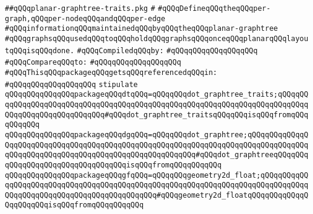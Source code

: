 \label{src/lib/std/dot/planar-graphtree-traits.pkg}
\verb|##qQQqplanar-graphtree-traits.pkg|\newline
\verb|#|\newline
\verb|#qQQqDefineqQQqtheqQQqper-graph,qQQqper-nodeqQQqandqQQqper-edge|\newline
\verb|#qQQqinformationqQQqmaintainedqQQqbyqQQqtheqQQqplanar-graphtree|\newline
\verb|#qQQqgraphsqQQqusedqQQqtoqQQqholdqQQqgraphsqQQqonceqQQqplanarqQQqlayoutqQQqisqQQqdone.|\newline
\newline
\verb|#qQQqCompiledqQQqby:|\newline
\verb|#qQQqqQQqqQQqqQQqqQQq|\newline
\newline
\verb|#qQQqCompareqQQqto:|\newline
\verb|#qQQqqQQqqQQqqQQqqQQq|\newline
\newline
\verb|#qQQqThisqQQqpackageqQQqgetsqQQqreferencedqQQqin:|\newline
\verb|#qQQqqQQqqQQqqQQqqQQq|\newline
\newline
\verb|stipulate|\newline
\verb|qQQqqQQqqQQqqQQqpackageqQQqdtqQQq=qQQqqQQqdot_graphtree_traits;qQQqqQQqqQQqqQQqqQQqqQQqqQQqqQQqqQQqqQQqqQQqqQQqqQQqqQQqqQQqqQQqqQQqqQQqqQQqqQQqqQQqqQQqqQQqqQQqqQQq#qQQqdot_graphtree_traitsqQQqqQQqisqQQqfromqQQqqQQqqQQq|\newline
\verb|qQQqqQQqqQQqqQQqpackageqQQqdgqQQq=qQQqqQQqdot_graphtree;qQQqqQQqqQQqqQQqqQQqqQQqqQQqqQQqqQQqqQQqqQQqqQQqqQQqqQQqqQQqqQQqqQQqqQQqqQQqqQQqqQQqqQQqqQQqqQQqqQQqqQQqqQQqqQQqqQQqqQQqqQQqqQQq#qQQqdot_graphtreeqQQqqQQqqQQqqQQqqQQqqQQqqQQqqQQqqQQqisqQQqfromqQQqqQQqqQQq|\newline
\verb|qQQqqQQqqQQqqQQqpackageqQQqgfqQQq=qQQqqQQqgeometry2d_float;qQQqqQQqqQQqqQQqqQQqqQQqqQQqqQQqqQQqqQQqqQQqqQQqqQQqqQQqqQQqqQQqqQQqqQQqqQQqqQQqqQQqqQQqqQQqqQQqqQQqqQQqqQQqqQQqqQQq#qQQqgeometry2d_floatqQQqqQQqqQQqqQQqqQQqqQQqisqQQqfromqQQqqQQqqQQq|\newline
